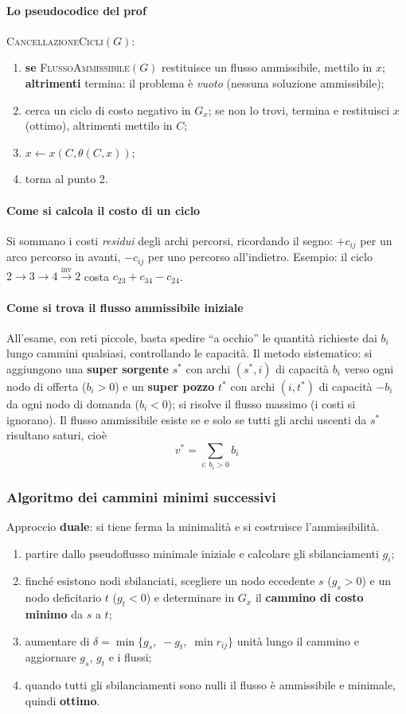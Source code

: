\documentclass[12pt]{extarticle} %
\begin{document}
\paragraph{Lo pseudocodice del prof}
\textsc{CancellazioneCicli}$(G)$:
\begin{enumerate}
    \item \textbf{se} \textsc{FlussoAmmissibile}$(G)$ restituisce un flusso ammissibile, mettilo in $x$; \textbf{altrimenti} termina: il problema è \emph{vuoto} (nessuna soluzione ammissibile);
    \item cerca un ciclo di costo negativo in $G_x$; se non lo trovi, termina e restituisci $x$ (ottimo), altrimenti mettilo in $C$;
    \item $x \leftarrow x(C, \theta(C,x))$;
    \item torna al punto 2.
\end{enumerate}

\paragraph{Come si calcola il costo di un ciclo}
Si sommano i costi \emph{residui} degli archi percorsi, ricordando il segno: $+c_{ij}$ per un arco percorso in avanti, $-c_{ij}$ per uno percorso all'indietro. Esempio: il ciclo $2\to3\to4\xrightarrow{\text{inv}}2$ costa $c_{23} + c_{34} - c_{24}$.

\paragraph{Come si trova il flusso ammissibile iniziale}
All'esame, con reti piccole, basta spedire ``a occhio'' le quantità richieste dai $b_i$ lungo cammini qualsiasi, controllando le capacità. Il metodo sistematico: si aggiungono una \textbf{super sorgente} $s^*$ con archi $(s^*,i)$ di capacità $b_i$ verso ogni nodo di offerta ($b_i>0$) e un \textbf{super pozzo} $t^*$ con archi $(i,t^*)$ di capacità $-b_i$ da ogni nodo di domanda ($b_i<0$); si risolve il flusso massimo (i costi si ignorano). Il flusso ammissibile esiste se e solo se tutti gli archi uscenti da $s^*$ risultano saturi, cioè
\[
v^* = \sum_{i:\, b_i>0} b_i
\]

\subsubsection{Algoritmo dei cammini minimi successivi}
Approccio \textbf{duale}: si tiene ferma la minimalità e si costruisce l'ammissibilità.
\begin{enumerate}
    \item partire dallo pseudoflusso minimale iniziale e calcolare gli sbilanciamenti $g_i$;
    \item finché esistono nodi sbilanciati, scegliere un nodo eccedente $s$ ($g_s>0$) e un nodo deficitario $t$ ($g_t<0$) e determinare in $G_x$ il \textbf{cammino di costo minimo} da $s$ a $t$;
    \item aumentare di $\delta = \min\{g_s,\; -g_t,\; \min r_{ij}\}$ unità lungo il cammino e aggiornare $g_s$, $g_t$ e i flussi;
    \item quando tutti gli sbilanciamenti sono nulli il flusso è ammissibile e minimale, quindi \textbf{ottimo}.
\end{enumerate}
\end{document}

